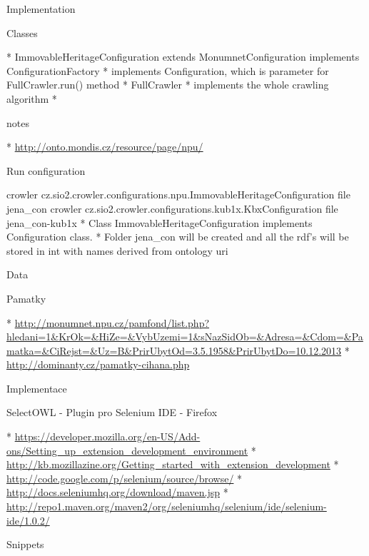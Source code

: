 \sec Implementation

\secc Classes

\begitems
  * ImmovableHeritageConfiguration extends MonumnetConfiguration implements ConfigurationFactory 
  \begitems
    * implements Configuration, which is parameter for FullCrawler.run() method
  \enditems
  * FullCrawler
  \begitems
    * implements the whole crawling algorithm
    * 
  \enditems
\enditems


\sec notes

\begitems
  * \url{http://onto.mondis.cz/resource/page/npu/}
\enditems

\secc Run configuration 

\begtt
crowler cz.sio2.crowler.configurations.npu.ImmovableHeritageConfiguration file jena_con
crowler cz.sio2.crowler.configurations.kub1x.KbxConfiguration file jena_con-kub1x
\endtt
\begitems
  * Class ImmovableHeritageConfiguration implements Configuration class. 
  * Folder jena\_con will be created and all the rdf's will be stored in int with names derived from ontology uri
\enditems


\chap Data

\sec Pamatky

\begitems
  * \url{http://monumnet.npu.cz/pamfond/list.php?hledani=1&KrOk=&HiZe=&VybUzemi=1&sNazSidOb=&Adresa=&Cdom=&Pamatka=&CiRejst=&Uz=B&PrirUbytOd=3.5.1958&PrirUbytDo=10.12.2013}
  * \url{http://dominanty.cz/pamatky-cihana.php}
\enditems


\chap Implementace

\sec SelectOWL - Plugin pro Selenium IDE - Firefox

\begitems
  * \url{https://developer.mozilla.org/en-US/Add-ons/Setting_up_extension_development_environment}
  * \url{http://kb.mozillazine.org/Getting_started_with_extension_development}
  * \url{http://code.google.com/p/selenium/source/browse/}
  * \url{http://docs.seleniumhq.org/download/maven.jsp}
  * \url{http://repo1.maven.org/maven2/org/seleniumhq/selenium/ide/selenium-ide/1.0.2/}
\enditems

\sec Snippets



\bye
